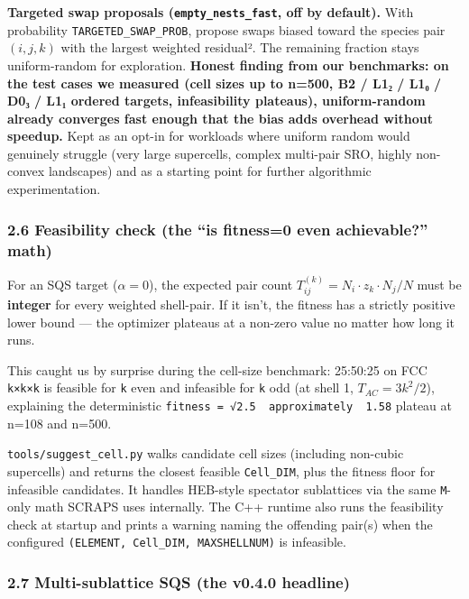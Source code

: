 \documentclass[
  11pt,
]{article}
\begin{document}
\textbf{Targeted swap proposals (\texttt{empty\_nests\_fast}, off by
default).} With probability \texttt{TARGETED\_SWAP\_PROB}, propose swaps
biased toward the species pair \((i, j, k)\) with the largest weighted
residual². The remaining fraction stays uniform-random for exploration.
\textbf{Honest finding from our benchmarks: on the test cases we
measured (cell sizes up to n=500, B2 / L1₂ / L1₀ / D0₃ / L1₁ ordered
targets, infeasibility plateaus), uniform-random already converges fast
enough that the bias adds overhead without speedup.} Kept as an opt-in
for workloads where uniform random would genuinely struggle (very large
supercells, complex multi-pair SRO, highly non-convex landscapes) and as
a starting point for further algorithmic experimentation.

\subsubsection{2.6 Feasibility check (the ``is fitness=0 even
achievable?''
math)}\label{feasibility-check-the-is-fitness0-even-achievable-math}

For an SQS target (\(\alpha = 0\)), the expected pair count
\(T_{ij}^{(k)} = N_i \cdot z_k \cdot N_j / N\) must be \textbf{integer}
for every weighted shell-pair. If it isn't, the fitness has a strictly
positive lower bound --- the optimizer plateaus at a non-zero value no
matter how long it runs.

This caught us by surprise during the cell-size benchmark: 25:50:25 on
FCC \texttt{k×k×k} is feasible for \texttt{k} even and infeasible for
\texttt{k} odd (at shell 1, \(T_{AC} = 3k^2/2\)), explaining the
deterministic \texttt{fitness\ =\ √2.5\ \ approximately\ \ 1.58} plateau
at n=108 and n=500.

\texttt{tools/suggest\_cell.py} walks candidate cell sizes (including
non-cubic supercells) and returns the closest feasible
\texttt{Cell\_DIM}, plus the fitness floor for infeasible candidates. It
handles HEB-style spectator sublattices via the same \texttt{M}-only
math SCRAPS uses internally. The C++ runtime also runs the feasibility
check at startup and prints a warning naming the offending pair(s) when
the configured \texttt{(ELEMENT,\ Cell\_DIM,\ MAXSHELLNUM)} is
infeasible.

\subsubsection{2.7 Multi-sublattice SQS (the v0.4.0
headline)}\label{multi-sublattice-sqs-the-v0.4.0-headline}
\end{document}
